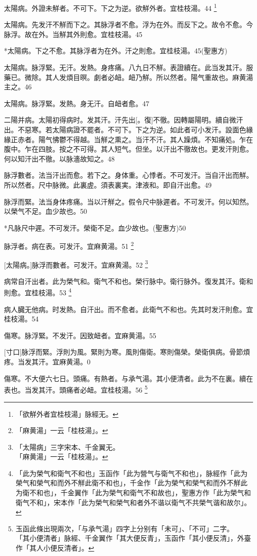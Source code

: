 \documentclass[12pt,twoside,UTF8,b5paper]{ctexbook}
\begin{document}
太陽病。外證未觧者。不可下。下之为逆。欲觧外者。宜桂枝湯。44
	\footnote{「欲觧外者宜桂枝湯」脉經无。}

太陽病。先发汗不觧而下之。其脉浮者不愈。浮为在外。而反下之。故令不愈。今脉浮。故在外。当觧其外則愈。宜桂枝湯。45

*太陽病。下之不愈。其脉浮者为在外。汗之則愈。宜桂枝湯。45(聖惠方)

太陽病。脉浮緊。无汗。发熱。身疼痛。八九日不觧。表證續在。此当发其汗。服藥已。微除。其人发煩目暝。劇者必衄。衄乃觧。所以然者。陽气重故也。麻黄湯主之。46

太陽病。脉浮緊。发熱。身无汗。自衄者愈。47

二陽并病。太陽初得病时。发其汗。汗先出[。復]不徹。因轉屬陽明。續自微汗出。不惡寒。若太陽病證不罷者。不可下。下之为逆。如此者可小发汗。設面色緣緣正赤者。陽气怫鬱不得越。当觧之熏之。当汗不汗。其人躁煩。不知痛処。乍在腹中。乍在四肢。按之不可得。其人短气。但坐。以汗出不徹故也。更发汗則愈。何以知汗出不徹。以脉濇故知之。48

脉浮數者。法当汗出而愈。若下之。身体重。心悸者。不可发汗。当自汗出而觧。所以然者。尺中脉微。此裏虗。須表裏実。津液和。即自汗出愈。49

脉浮而緊。法当身体疼痛。当以汗觧之。假令尺中脉遲者。不可发汗。何以知然。以榮气不足。血少故也。50

*凡脉尺中遲。不可发汗。榮衛不足。血少故也。(聖惠方)50

脉浮者。病在表。可发汗。宜麻黄湯。51
	\footnote{「麻黄湯」一云「桂枝湯」。}

[太陽病。]脉浮而數者。可发汗。宜麻黄湯。52
	\footnote{「太陽病」三字宋本、千金翼无。\\「麻黄湯」一云「桂枝湯」。}

病常自汗出者。此为榮气和。衛气不和也。榮行脉中。衛行脉外。復发其汗。衛和則愈。宜桂枝湯。53
	\footnote{「此为榮气和衛气不和也」玉函作「此为營气与衛气不和也」，脉經作「此为榮气和榮气和而外不觧此衛不和也」，千金作「此为榮气和榮气和而外不觧此为衛不和也」，千金翼作「此为榮气和衛气不和故也」，聖惠方作「此为榮气和衛气不和」，宋本作「此为榮气和榮气和者外不谐以衛气不共榮气谐和故尔」。}

病人臓无他病。时发熱。自汗出。而不愈者。此衛气不和也。先其时发汗則愈。宜桂枝湯。54

傷寒。脉浮緊。不发汗。因致衄者。宜麻黄湯。55

[寸口]脉浮而緊。浮則为風。緊則为寒。風則傷衛。寒則傷榮。榮衛俱病。骨節煩疼。当发其汗。宜麻黄湯。0

傷寒。不大便六七日。頭痛。有熱者。与承气湯。其小便清者。此为不在裏。續在表也。当发其汗。頭痛者必衄。宜桂枝湯。56
	\footnote{玉函此條出現兩次，「与承气湯」四字上分别有「未可」、「不可」二字。\\「其小便清者」脉經、千金翼作「其大便反青」，玉函作「其小便反清」，外臺作「其人小便反清者」。}
\end{document}
